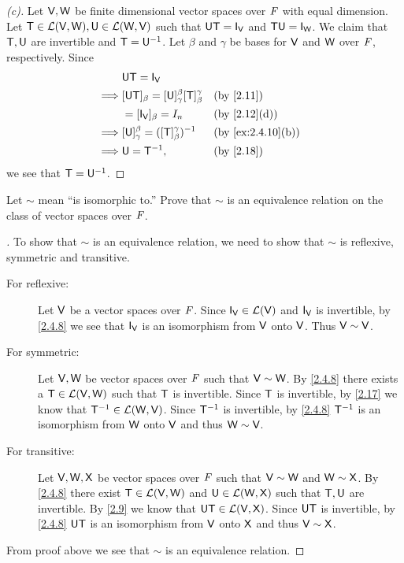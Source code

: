 \begin{proof}[(c)]
	Let \(\mathsf{V}, \mathsf{W}\) be finite dimensional vector spaces over \(\mathit{F}\) with equal dimension.
	Let \(\mathsf{T} \in \mathcal{L}(\mathsf{V}, \mathsf{W}), \mathsf{U} \in \mathcal{L}(\mathsf{W}, \mathsf{V})\) such that \(\U \T = \IT[\V]\) and \(\T \U = \IT[\W]\).
	We claim that \(\mathsf{T}, \mathsf{U}\) are invertible and \(\mathsf{T} = \mathsf{U}^{-1}\).
	Let \(\beta\) and \(\gamma\) be bases for \(\mathsf{V}\) and \(\mathsf{W}\) over \(\mathit{F}\), respectively.
	Since
	\begin{align*}
		         & \U \T = \IT[\V]                                                                      \\
		\implies & [\U \T]_{\beta} = [\U]_{\gamma}^{\beta} [\T]_{\beta}^{\gamma} &  & \by{2.11}         \\
		         & = [\IT[\V]]_{\beta} = I_n                                     &  & \by{2.12}[d]      \\
		\implies & [\U]_{\gamma}^{\beta} = ([\T]_{\beta}^{\gamma})^{-1}          &  & \by{ex:2.4.10}[b] \\
		\implies & \U = \T^{-1},                                                 &  & \by{2.18}
	\end{align*}
	we see that \(\mathsf{T} = \mathsf{U}^{-1}\).
\end{proof}

\setcounter{ex}{12}
\begin{ex}\label{ex:2.4.13}
	Let \(\sim\) mean ``is isomorphic to.''
	Prove that \(\sim\) is an equivalence relation on the class of vector spaces over \(\mathit{F}\).
\end{ex}

\begin{proof}[]
	To show that \(\sim\) is an equivalence relation, we need to show that \(\sim\) is reflexive, symmetric and transitive.
	\begin{description}
		\item[For reflexive:]
			Let \(\mathsf{V}\) be a vector spaces over \(\mathit{F}\).
			Since \(\IT[\V] \in \ls(\V)\) and \(\IT[\V]\) is invertible, by \cref{2.4.8} we see that \(\IT[\V]\) is an isomorphism from \(\mathsf{V}\) onto \(\mathsf{V}\).
			Thus \(\mathsf{V} \sim \mathsf{V}\).
		\item[For symmetric:]
			Let \(\mathsf{V}, \mathsf{W}\) be vector spaces over \(\mathit{F}\) such that \(\mathsf{V} \sim \mathsf{W}\).
			By \cref{2.4.8} there exists a \(\mathsf{T} \in \mathcal{L}(\mathsf{V}, \mathsf{W})\) such that \(\mathsf{T}\) is invertible.
			Since \(\mathsf{T}\) is invertible, by \cref{2.17} we know that \(\mathsf{T}^{-1} \in \mathcal{L}(\mathsf{W}, \mathsf{V})\).
			Since \(\mathsf{T}^{-1}\) is invertible, by \cref{2.4.8} \(\mathsf{T}^{-1}\) is an isomorphism from \(\mathsf{W}\) onto \(\mathsf{V}\) and thus \(\mathsf{W} \sim \mathsf{V}\).
		\item[For transitive:]
			Let \(\mathsf{V}, \mathsf{W}, \mathsf{X}\) be vector spaces over \(\mathit{F}\) such that \(\mathsf{V} \sim \mathsf{W}\) and \(\mathsf{W} \sim \mathsf{X}\).
			By \cref{2.4.8} there exist \(\mathsf{T} \in \mathcal{L}(\mathsf{V}, \mathsf{W})\) and \(\mathsf{U} \in \mathcal{L}(\mathsf{W}, \mathsf{X})\) such that \(\mathsf{T}, \mathsf{U}\) are invertible.
			By \cref{2.9} we know that \(\mathsf{U} \mathsf{T} \in \mathcal{L}(\mathsf{V}, \mathsf{X})\).
			Since \(\mathsf{U} \mathsf{T}\) is invertible, by \cref{2.4.8} \(\mathsf{U} \mathsf{T}\) is an isomorphism from \(\mathsf{V}\) onto \(\mathsf{X}\) and thus \(\mathsf{V} \sim \mathsf{X}\).
	\end{description}
	From proof above we see that \(\sim\) is an equivalence relation.
\end{proof}

